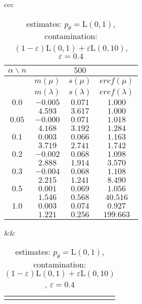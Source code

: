 {\begin{table}[htb] \footnotesize
\begin{center}
\begin{tabular}{ccc}
	\begin{tabular}{|c|ccc|}
	\hline
	$\alpha\backslash n$ &&  $500$ & \\
	\hline
	& $m(\mu)$ & $s(\mu)$ & $eref(\mu)$ \\
	& $m(\lambda)$ & $s(\lambda)$ & $eref(\lambda)$ \\
	\hline
	$0.0$ & $ -0.005 $ & $ 0.071 $ & $ 1.000 $\\
	 & $ 4.593 $ & $ 3.617 $ & $ 1.000 $\\
	\hline
	$0.05$ & $ -0.000 $ & $ 0.071 $ & $ 1.018 $\\
	 & $ 4.168 $ & $ 3.192 $ & $ 1.284 $\\
	\hline
	$0.1$ & $ 0.003 $ & $ 0.066 $ & $ 1.163 $\\
	 & $ 3.719 $ & $ 2.741 $ & $ 1.742 $\\
	\hline
	$0.2$ & $ -0.002 $ & $ 0.068 $ & $ 1.098 $\\
	 & $ 2.888 $ & $ 1.914 $ & $ 3.570 $\\
	\hline
	$0.3$ & $ -0.004 $ & $ 0.068 $ & $ 1.108 $\\
	 & $ 2.215 $ & $ 1.241 $ & $ 8.490 $\\
	\hline
	$0.5$ & $ 0.001 $ & $ 0.069 $ & $ 1.056 $\\
	 & $ 1.546 $ & $ 0.568 $ & $ 40.516 $\\
	\hline
	$1.0$ & $ 0.003 $ & $ 0.074 $ & $ 0.927 $\\
	 & $ 1.221 $ & $ 0.256 $ & $ 199.663 $\\
	\hline
	\end{tabular}
&&
	\begin{tabular}{c}
		\epsfig{file=Laplace-e04-eref.eps, height=2.5in}
	\end{tabular}
\\
\end{tabular}
\end{center}
\caption{\R estimates: $p_\theta = \mathrm{L}(0,1)$, contamination: $(1-\varepsilon)\mathrm{L}(0,1) + \varepsilon \mathrm{L}(0,10)$, $\varepsilon =  0.4$}
\label{tabJK:laplace-eref}
\end{table}

}
